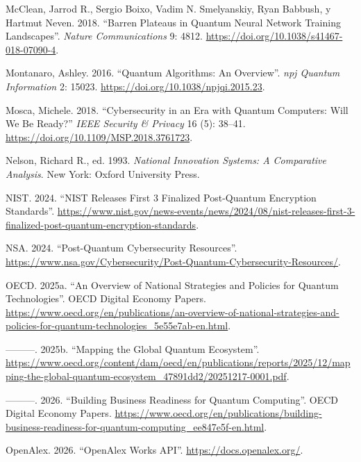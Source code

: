 \documentclass[
  11pt,
  letterpaper,
]{article}
\newlength{\cslhangindent}
\newenvironment{CSLReferences}[2] %
 {\begin{list}{}{%
  \setlength{\itemindent}{0pt}
  \setlength{\leftmargin}{0pt}
  \setlength{\parsep}{0pt}
  \ifodd #1
   \setlength{\leftmargin}{\cslhangindent}
   \setlength{\itemindent}{-1\cslhangindent}
  \fi
  \setlength{\itemsep}{#2\baselineskip}}}
 {\end{list}}
\begin{document}
\begin{CSLReferences}{1}{0}
McClean, Jarrod R., Sergio Boixo, Vadim N. Smelyanskiy, Ryan Babbush, y
Hartmut Neven. 2018. {``Barren Plateaus in Quantum Neural Network
Training Landscapes''}. \emph{Nature Communications} 9: 4812.
\url{https://doi.org/10.1038/s41467-018-07090-4}.

Montanaro, Ashley. 2016. {``Quantum Algorithms: An Overview''}.
\emph{npj Quantum Information} 2: 15023.
\url{https://doi.org/10.1038/npjqi.2015.23}.

Mosca, Michele. 2018. {``Cybersecurity in an Era with Quantum Computers:
Will We Be Ready?''} \emph{IEEE Security \& Privacy} 16 (5): 38--41.
\url{https://doi.org/10.1109/MSP.2018.3761723}.

Nelson, Richard R., ed. 1993. \emph{National Innovation Systems: A
Comparative Analysis}. New York: Oxford University Press.

NIST. 2024. {``NIST Releases First 3 Finalized Post-Quantum Encryption
Standards''}.
\url{https://www.nist.gov/news-events/news/2024/08/nist-releases-first-3-finalized-post-quantum-encryption-standards}.

NSA. 2024. {``Post-Quantum Cybersecurity Resources''}.
\url{https://www.nsa.gov/Cybersecurity/Post-Quantum-Cybersecurity-Resources/}.

OECD. 2025a. {``An Overview of National Strategies and Policies for
Quantum Technologies''}. OECD Digital Economy Papers.
\url{https://www.oecd.org/en/publications/an-overview-of-national-strategies-and-policies-for-quantum-technologies_5e55e7ab-en.html}.

---------. 2025b. {``Mapping the Global Quantum Ecosystem''}.
\url{https://www.oecd.org/content/dam/oecd/en/publications/reports/2025/12/mapping-the-global-quantum-ecosystem_47891dd2/20251217-0001.pdf}.

---------. 2026. {``Building Business Readiness for Quantum
Computing''}. OECD Digital Economy Papers.
\url{https://www.oecd.org/en/publications/building-business-readiness-for-quantum-computing_ee847e5f-en.html}.

OpenAlex. 2026. {``OpenAlex Works API''}.
\url{https://docs.openalex.org/}.


\end{CSLReferences}
\end{document}
